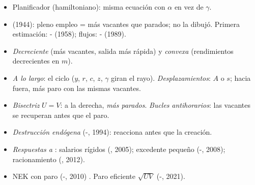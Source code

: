 \documentclass{article}
\begin{document}
\begin{columnas}
\begin{itemize}
\begin{itemize}
  \item Planificador (hamiltoniano): misma ecuación con $\alpha$ en vez de $\gamma$.
  \end{itemize}
\end{itemize}
\begin{itemize}
\item {} (1944): pleno empleo = más vacantes que parados; no la dibujó. Primera estimación: - (1958); flujos: - (1989).
\item \emph{Decreciente} (más vacantes, salida más rápida) y \emph{convexa} (rendimientos decrecientes en $m$).
\item \emph{A lo largo}: el ciclo ($y$, $r$, $c$, $z$, $\gamma$ giran el rayo). \emph{Desplazamientos}: $A$ o $s$; hacia fuera, más paro con las mismas vacantes.
\item \emph{Bisectriz} $U=V$: a la derecha, \emph{más parados}. \emph{Bucles} \emph{antihorarios}: las vacantes se recuperan antes que el paro.
\end{itemize}

\begin{itemize}
\item \emph{Destrucción endógena} (-, 1994): reacciona antes que la creación.
\item \emph{Respuestas a }: salarios rígidos (, 2005); excedente pequeño (-, 2008); racionamiento (, 2012).
\item NEK con paro (-, 2010) . Paro eficiente $\sqrt{UV}$ (-, 2021).
\end{itemize}


\end{columnas}
\end{document}

